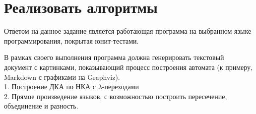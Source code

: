 \documentclass[a4paper, 12pt]{article}
\begin{document}
\newpage


\section{Реализовать алгоритмы}
Ответом на данное задание является работающая программа на выбранном языке программирования, покрытая юнит-тестами.

В рамках своего выполнения программа должна генерировать текстовый документ с картинками, показывающий процесс построения автомата (к примеру, Markdown с графиками на Graphviz).\\
1. Построение ДКА по НКА с $\lambda$-переходами \\
2. Прямое произведение языков, с возможностью построить пересечение, объединение и разность.
\end{document}
